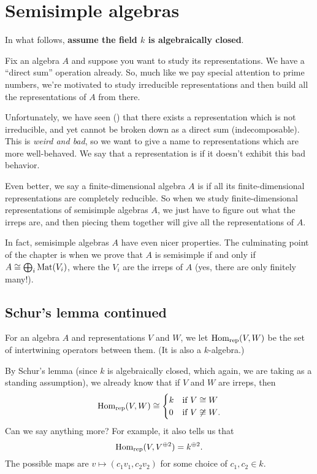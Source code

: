 \chapter{Semisimple algebras}
In what follows, \textbf{assume the field $k$ is algebraically closed}.

Fix an algebra $A$ and suppose
you want to study its representations.
We have a ``direct sum'' operation already.
So, much like we pay special attention to prime numbers,
we're motivated to study irreducible representations
and then build all the representations of $A$ from there.

Unfortunately, we have seen ()
that there exists a representation which is not irreducible,
and yet cannot be broken down as a direct sum (indecomposable).
This is \emph{weird and bad}, so we want to give a name
to representations which are more well-behaved.
We say that a representation is 
if it doesn't exhibit this bad behavior.

Even better, we say a finite-dimensional algebra $A$
is  if all its finite-dimensional
representations are completely reducible.
So when we study finite-dimensional representations of
semisimple algebras $A$,
we just have to figure out what the irreps are,
and then piecing them together will give all
the representations of $A$.

In fact, semisimple algebras $A$ have even nicer properties.
The culminating point of the chapter is when we prove that
$A$ is semisimple if and only if $A \cong \bigoplus_i \mathrm{Mat}(V_i)$,
where the $V_i$ are the irreps of $A$
(yes, there are only finitely many!).

\section{Schur's lemma continued}
\begin{definition}
	For an algebra $A$ and representations $V$ and $W$,
	we let $\operatorname{Hom}_{\mathrm{rep}}(V,W)$ be the set of intertwining operators between them.
	(It is also a $k$-algebra.)
\end{definition}

By Schur's lemma (since $k$ is algebraically closed,
which again, we are taking as a standing assumption),
we already know that if $V$ and $W$ are irreps, then
\[
	\operatorname{Hom}_{\mathrm{rep}}(V,W) \cong
	\begin{cases}
		k & \text{if $V \cong W$} \\
		0 & \text{if $V \not\cong W$}.
	\end{cases}
\]
Can we say anything more?
For example, it also tells us that
\[ \operatorname{Hom}_{\mathrm{rep}}(V, V^{\oplus 2}) = k^{\oplus 2}. \]
The possible maps are $v \mapsto (c_1v_1, c_2v_2)$ for some choice of $c_1, c_2 \in k$.

